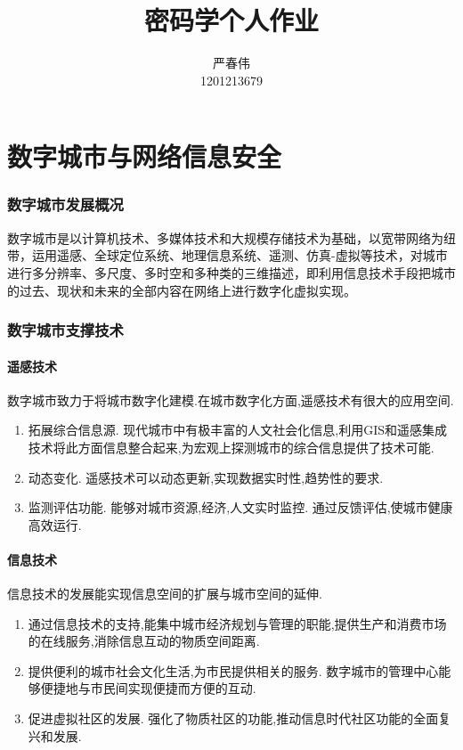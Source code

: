 \documentclass[a4paper]{ctexart}
\author{严春伟\\ 1201213679}
\title{密码学个人作业}
\begin{document}
    \maketitle

\part{数字城市与网络信息安全}
    \section{数字城市发展概况}
    \par 数字城市是以计算机技术、多媒体技术和大规模存储技术为基础，以宽带网络为纽带，运用遥感、全球定位系统、地理信息系统、遥测、仿真-虚拟等技术，对城市进行多分辨率、多尺度、多时空和多种类的三维描述，即利用信息技术手段把城市的过去、现状和未来的全部内容在网络上进行数字化虚拟实现。 \cite{china-digital-city}

    \section{数字城市支撑技术}
    \subsection{遥感技术}
    \par 数字城市致力于将城市数字化建模.在城市数字化方面,遥感技术有很大的应用空间.
    \begin{enumerate}
        \item 拓展综合信息源. 现代城市中有极丰富的人文社会化信息,利用GIS和遥感集成技术将此方面信息整合起来,为宏观上探测城市的综合信息提供了技术可能.
        \item 动态变化. 遥感技术可以动态更新,实现数据实时性,趋势性的要求.
        \item 监测评估功能. 能够对城市资源,经济,人文实时监控. 通过反馈评估,使城市健康高效运行.
    \end{enumerate}

    \subsection{信息技术}
    \par 信息技术的发展能实现信息空间的扩展与城市空间的延伸.
    \begin{enumerate}
        \item 通过信息技术的支持,能集中城市经济规划与管理的职能,提供生产和消费市场的在线服务,消除信息互动的物质空间距离.
        \item 提供便利的城市社会文化生活,为市民提供相关的服务. 数字城市的管理中心能够便捷地与市民间实现便捷而方便的互动.
        \item 促进虚拟社区的发展. 强化了物质社区的功能,推动信息时代社区功能的全面复兴和发展.
    \end{enumerate}
\end{document}
